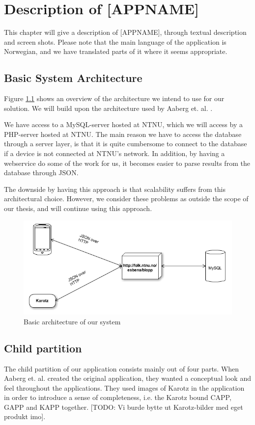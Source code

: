 \chapter{Description of [APPNAME]}
\label{chp:description}

This chapter will give a description of [APPNAME], through textual description and screen shots. Please note that the main language of the application is Norwegian, and we have translated parts of it where it seems appropriate. 

\section{Basic System Architecture}
Figure \ref{fig:basic-architecture} shows an overview of the architecture we intend to use for our solution. We will build upon the architecture used by Aaberg et. al. \cite{CustomerDriven}.

We have access to a MySQL-server hosted at NTNU, which we will access by a PHP-server hosted at NTNU. The main reason we have to access the database through a server layer, is that it is quite cumbersome to connect to the database if a device is not connected at NTNU's network. In addition, by having a webservice do some of the work for us, it becomes easier to parse results from the database through JSON.   


The downside by having this approach is that scalability suffers from this architectural choice. However, we consider these problems as outside the scope of our thesis, and will continue using this approach.

\begin{figure}
		\centering
			\includegraphics[width=0.50\paperwidth]{Pictures/basic-architecture.png}
		\caption{Basic architecture of our system}
		\label{fig:basic-architecture}
\end{figure}

\section{Child partition}
\label{sec:description-child-partition}
The child partition of our application consists mainly out of four parts. When Aaberg et. al. created the original application, they wanted a conceptual look and feel throughout the applications. They used images of Karotz in the application in order to introduce a sense of completeness, i.e. the Karotz bound CAPP, GAPP and KAPP together. [TODO: Vi burde bytte ut Karotz-bilder med eget produkt imo]. 

